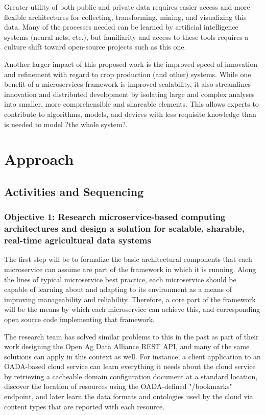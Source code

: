 \documentclass[11pt]{article}
\begin{document}
Greater utility of both public and private data requires easier access and more flexible architectures 
for collecting, transforming, mining, and visualizing this data. Many of the processes needed can be 
learned by artificial intelligence systems (neural nets, etc.), but familiarity and access to these tools 
requires a culture shift toward open-source projects such as this one.

Another larger impact of this proposed work is the improved speed of innovation and refinement 
with regard to crop production (and other) systems.  While one benefit of a microservices framework is 
improved scalability, it also streamlines innovation and distributed development by isolating large and 
complex analyses into smaller, more comprehensible and shareable elements. This allows experts to 
contribute to algorithms, models, and devices with less requisite knowledge than is needed to 
model ?the whole system?.

\section{Approach}

\subsection{Activities and Sequencing}

\subsubsection{Objective 1: Research microservice-based computing architectures and design a solution for scalable, 
	sharable, real-time agricultural data systems}   
	
The first step will be to formalize the basic architectural components that each microservice can assume 
are part of the framework in which it is running.  Along the lines of typical microservice best practice, 
each microservice should be capable of learning about and adapting to its environment as a means of 
improving manageability and reliability.  Therefore, a core part of the framework will be the means by which 
each microservice can achieve this, and corresponding open source code implementing that framework.  

The research team has solved similar problems to this in the past as part of their work designing the 
Open Ag Data Alliance REST API, and many of the same solutions can apply in this context as well.  
For instance, a client application to an OADA-based cloud service can learn everything it needs about 
the cloud service by retrieving a cacheable domain configuration document at a standard location, discover 
the location of resources using the OADA-defined "/bookmarks" endpoint, and later learn the data formats and 
ontologies used by the cloud via content types that are reported with each resource.  
\end{document}

